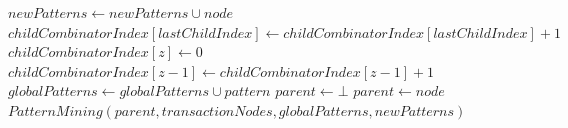 \documentclass{acm_proc_article-sp-sigmod09}
\begin{document}
\begin{algorithm}
\begin{algorithmic}[1]
                        \State $newPatterns \gets newPatterns \cup node$
                    \EndFor
                    \State $childCombinatorIndex[lastChildIndex] \gets childCombinatorIndex[lastChildIndex] + 1$
                            \State $childCombinatorIndex[z] \gets 0$
                            \State $childCombinatorIndex[z - 1] \gets childCombinatorIndex[z - 1] + 1$
                        \EndIf
                    \EndFor
                \EndWhile
            \EndFor
        \EndFor
    \EndFor
            \State $globalPatterns \gets globalPatterns \cup pattern$
        \EndIf
    \EndFor
    \State $parent \gets \bot$
            \State $parent \gets node$
        \EndIf
    \EndFor
        \State $PatternMining(parent, transactionNodes, globalPatterns, newPatterns)$
    \EndIf
\EndIf
\EndFunction
\end{algorithmic}
\end{algorithm}
\end{document}

